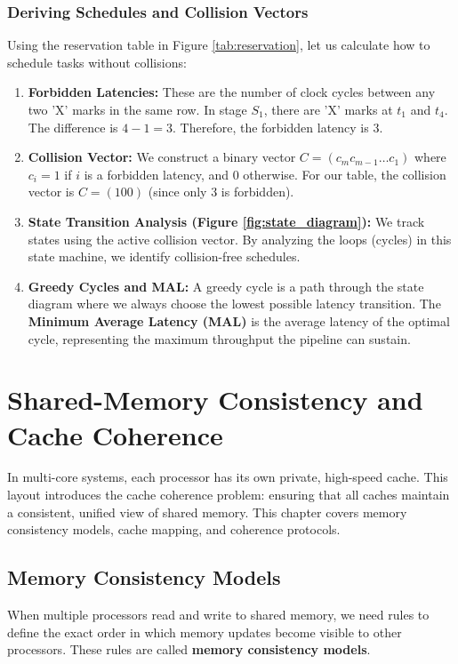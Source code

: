 \documentclass[12pt,a4paper,openany]{book}
\begin{document}
\subsection{Deriving Schedules and Collision Vectors}
Using the reservation table in Figure \ref{tab:reservation}, let us calculate how to schedule tasks without collisions:
\begin{enumerate}
    \item \textbf{Forbidden Latencies:} These are the number of clock cycles between any two 'X' marks in the same row. In stage $S_1$, there are 'X' marks at $t_1$ and $t_4$. The difference is $4 - 1 = 3$. Therefore, the forbidden latency is $3$.
    \item \textbf{Collision Vector:} We construct a binary vector $C = (c_m c_{m-1} \dots c_1)$ where $c_i = 1$ if $i$ is a forbidden latency, and $0$ otherwise. For our table, the collision vector is $C = (100)$ (since only 3 is forbidden).
    \item \textbf{State Transition Analysis (Figure \ref{fig:state_diagram}):} We track states using the active collision vector. By analyzing the loops (cycles) in this state machine, we identify collision-free schedules.
    \item \textbf{Greedy Cycles and MAL:} A greedy cycle is a path through the state diagram where we always choose the lowest possible latency transition. The \textbf{Minimum Average Latency (MAL)} is the average latency of the optimal cycle, representing the maximum throughput the pipeline can sustain.
\end{enumerate}

\chapter[Shared-Memory Consistency and Coherence]{Shared-Memory Consistency and Cache Coherence}

In multi-core systems, each processor has its own private, high-speed cache. This layout introduces the cache coherence problem: ensuring that all caches maintain a consistent, unified view of shared memory. This chapter covers memory consistency models, cache mapping, and coherence protocols.

\section{Memory Consistency Models}
When multiple processors read and write to shared memory, we need rules to define the exact order in which memory updates become visible to other processors. These rules are called \textbf{memory consistency models}.
\end{document}
